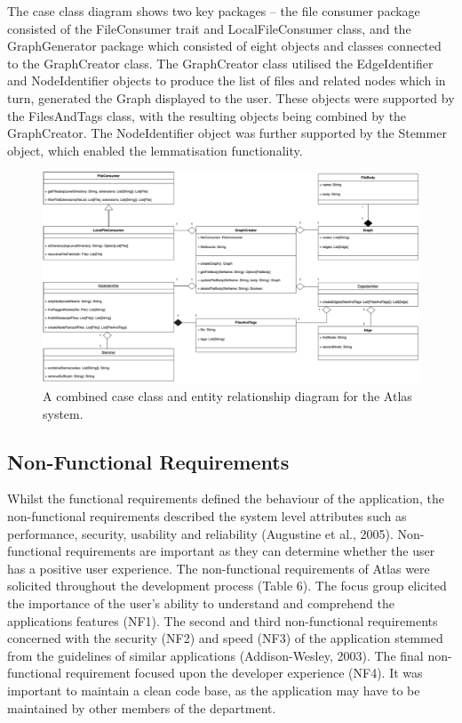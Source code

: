 \documentclass{article}
\begin{document}
The case class diagram shows two key packages – the file consumer package consisted of the FileConsumer trait and LocalFileConsumer class, and the GraphGenerator package which consisted of eight objects and classes connected to the GraphCreator class. The GraphCreator class utilised the EdgeIdentifier and NodeIdentifier objects to produce the list of files and related nodes which in turn, generated the Graph displayed to the user. These objects were supported by the FilesAndTags class, with the resulting objects being combined by the GraphCreator. The NodeIdentifier object was further supported by the Stemmer object, which enabled the lemmatisation functionality.

\begin{figure}[!htb]
  \centering
      \includegraphics[width=1\textwidth]{images/entity-relationship.png}
  \caption{A combined case class and entity relationship diagram for the Atlas system.}
\end{figure}

\subsection{Non-Functional Requirements}

Whilst the functional requirements defined the behaviour of the application, the non-functional requirements described the system level attributes such as performance, security, usability and reliability (Augustine et al., 2005). Non-functional requirements are important as they can determine whether the user has a positive user experience. The non-functional requirements of Atlas were solicited throughout the development process (Table 6). The focus group elicited the importance of the user’s ability to understand and comprehend the applications features (NF1). The second and third non-functional requirements concerned with the security (NF2) and speed (NF3) of the application stemmed from the guidelines of similar applications (Addison-Wesley, 2003). The final non-functional requirement focused upon the developer experience (NF4). It was important to maintain a clean code base, as the application may have to be maintained by other members of the department. 
\end{document}

